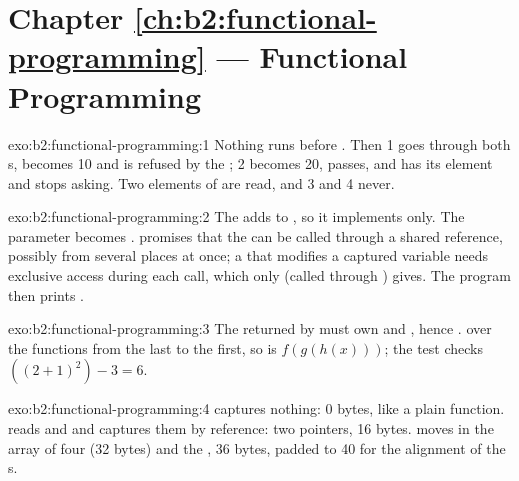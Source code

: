 \section*{Chapter \ref{ch:b2:functional-programming} --- Functional Programming}

\begin{solution}{exo:b2:functional-programming:1}
Nothing runs before . Then 1 goes through both s, becomes 10 and is refused by the ; 2
becomes 20, passes, and  has its element and stops asking. Two elements of  are read, and 3 and 4
never.
\end{solution}

\begin{solution}{exo:b2:functional-programming:2}
The  adds to , so it implements  only. The parameter becomes .  promises that the  can be called through a shared reference,
possibly from several places at once; a  that modifies a captured variable needs exclusive access during
each call, which only  (called through ) gives. The program then prints .
\end{solution}

\begin{solution}{exo:b2:functional-programming:3}
The  returned by  must own  and , hence .  
over the functions from the last to the first, so  is $f(g(h(x)))$; the test
checks $((2 + 1)^2) - 3 = 6$.
\end{solution}

\begin{solution}{exo:b2:functional-programming:4}
 captures nothing: 0 bytes, like a plain function.  reads  and  and captures
them by reference: two pointers, 16 bytes.  moves in the array of four  (32 bytes) and the
, 36 bytes, padded to 40 for the alignment of the s.
\end{solution}

